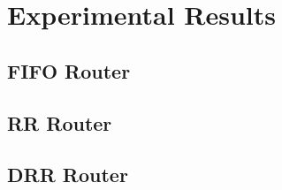 \section{Experimental Results}

\subsection{FIFO Router}

\subsection{RR Router}

\subsection{DRR Router}